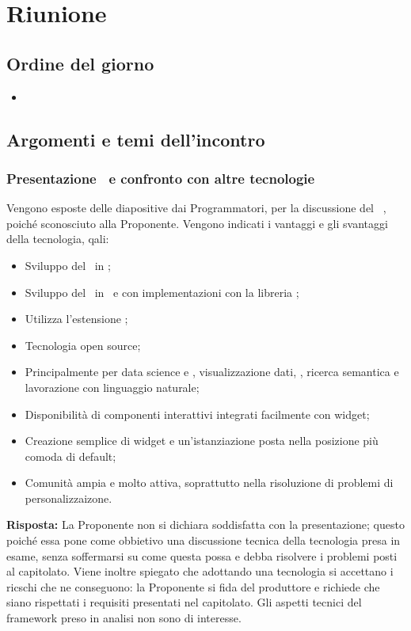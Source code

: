 \section{Riunione}
\subsection{Ordine del giorno}
\begin{itemize}
	\item
\end{itemize}

\subsection{Argomenti e temi dell'incontro}

\subsubsection{Presentazione \ e confronto con altre tecnologie}

\par Vengono esposte delle diapositive dai Programmatori, per la discussione del \ , poiché sconosciuto alla Proponente. Vengono indicati i vantaggi e gli svantaggi della tecnologia, qali:
\begin{itemize}
	\item Sviluppo del \ in ;
	\item Sviluppo del \ in \ e con implementazioni con la libreria ;
	\item Utilizza l'estensione ;
	\item Tecnologia open source;
	\item Principalmente per data science e , visualizzazione dati, , ricerca semantica e lavorazione con linguaggio naturale;
	\item Disponibilità di componenti interattivi integrati facilmente con widget;
	\item Creazione semplice di widget e un'istanziazione posta nella posizione più comoda di default;
	\item Comunità ampia e molto attiva, soprattutto nella risoluzione di problemi di personalizzaizone.
\end{itemize}

\par \textbf{Risposta:} La Proponente non si dichiara soddisfatta con la presentazione; questo poiché essa pone come obbietivo una discussione tecnica della tecnologia presa in esame, senza soffermarsi su come questa possa e debba risolvere i problemi posti al capitolato. 
Viene inoltre spiegato che adottando una tecnologia si accettano i ricschi che ne conseguono: la Proponente si fida del produttore e richiede che siano rispettati i requisiti presentati nel capitolato. 
Gli aspetti tecnici del framework preso in analisi non sono di interesse.

